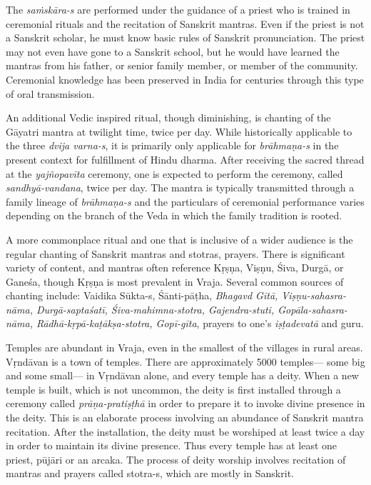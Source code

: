 The {\sl saṁskāra-s} are performed under the guidance of a priest who is trained in ceremonial rituals and the recitation of Sanskrit mantras. Even if the priest is not a Sanskrit scholar, he must know basic rules of Sanskrit pronunciation. The priest may not even have gone to a Sanskrit school, but he would have learned the mantras from his father, or senior family member, or member of the community. Ceremonial knowledge has been preserved in India for centuries through this type of oral transmission. 

An additional Vedic inspired ritual, though diminishing, is chanting of the Gāyatri mantra at twilight time, twice per day. While historically applicable to the three {\sl dvija varna-s}, it is primarily only applicable for {\sl brāhmaṇa-s} in the present context for fulfillment of Hindu dharma. After receiving the sacred thread at the {\sl yajñopavīta} ceremony, one is expected to perform the ceremony, called {\sl sandhyā-vandana}, twice per day. The mantra is typically transmitted through a family lineage of {\sl brāhmaṇa-s} and the particulars of ceremonial performance varies depending on the branch of the Veda in which the family tradition is rooted. 

A more commonplace ritual and one that is inclusive of a wider audience is the regular chanting of Sanskrit mantras and stotras, prayers. There is significant variety of content, and mantras often reference Kṛṣṇa, Viṣṇu, Śiva, Durgā, or Ganeśa, though Kṛṣṇa is most prevalent in Vraja. Several common sources of chanting include: Vaidika Sūkta-s, Śānti-pāṭha, {\sl Bhagavd Gītā, Viṣṇu-sahasra-nāma, Durgā-saptaśatī, Śiva-mahimna-stotra, Gajendra-stuti, Gopāla-sahasra-nāma, Rādhā-kṛpā-kaṭākṣa-stotra, Gopī-gīta}, prayers to one’s {\sl iṣṭadevatā} and guru. 

Temples are abundant in Vraja, even in the smallest of the villages in rural areas. Vṛndāvan is a town of temples. There are approximately 5000 temples— some big and some small— in Vṛndāvan alone, and every temple has a deity. When a new temple is built, which is not uncommon, the deity is first installed through a ceremony called {\sl prāṇa-pratiṣṭhā} in order to prepare it to invoke divine presence in the deity. This is an elaborate process involving an abundance of Sanskrit mantra recitation. After the installation, the deity must be worshiped at least twice a day in order to maintain its divine presence. Thus every temple has at least one priest, pūjāri or an arcaka. The process of deity worship involves recitation of mantras and prayers called stotra-s, which are mostly in Sanskrit. 


